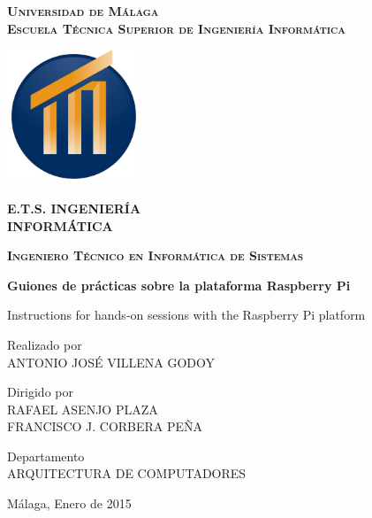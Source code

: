 \documentclass[12pt,a4paper]{book} %
\newcommand{\pfctitlename}{Guiones de prácticas sobre la plataforma Raspberry Pi}
\newcommand{\pfcanno}{2015}
\begin{document}
\begin{titlepage}
  \begin{center}
    \large
    \scshape
    \bfseries
    Universidad de Málaga \\
    Escuela Técnica Superior de Ingeniería Informática
  \end{center}

  \smallskip

  \begin{center}
    \includegraphics[width=4cm,keepaspectratio]{graphs/EscudoETSIIcolor.pdf}

    \bfseries
    \color[rgb]{0,0.18,0.39}
    \fontsize{15}{15}
    \selectfont E.T.S. INGENIERÍA\\
    \fontsize{20}{20}
    \selectfont INFORMÁTICA
  \end{center}

  \begin{center}
    \scshape
    \large
    \bfseries
    Ingeniero Técnico en Informática de Sistemas
  \end{center}

  \smallskip

  \begin{center}
    \huge
    \sffamily
    \bfseries
    \pfctitlename
  \end{center}

  \begin{center}
    \huge
    \sffamily
    Instructions for hands-on sessions with the Raspberry Pi platform
  \end{center}

  \bigskip

  \begin{center}
    \huge
    \sffamily
    Realizado por\\
    ANTONIO JOSÉ VILLENA GODOY
  \end{center}

  \begin{center}
    \huge
    \sffamily
    Dirigido por\\
    RAFAEL ASENJO PLAZA\\
    FRANCISCO J. CORBERA PEÑA
  \end{center}

  \begin{center}
    \huge
    \sffamily
    Departamento\\
    ARQUITECTURA DE COMPUTADORES
  \end{center}

  \vfill

  \hfill \large Málaga, Enero de \pfcanno
\end{titlepage}
\end{document}
